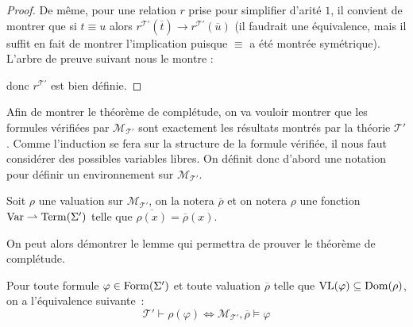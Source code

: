 \begin{proof}
  De même, pour une relation $r$ prise pour simplifier d'arité $1$, il convient
  de montrer que si $t\equiv u$ alors
  $r^{\mathcal T'}(\overline t)\to r^{\mathcal T'}(\overline u)$ (il faudrait une
  équivalence, mais il suffit en fait de montrer l'implication puisque $\equiv$
  a été montrée symétrique). L'arbre de preuve suivant nous le montre :
  \begin{prooftree}
  \end{prooftree}
  donc $r^{\mathcal T'}$ est bien définie.
\end{proof}

Afin de montrer le théorème de complétude, on va vouloir montrer que les
formules vérifiées par $\mathcal M_{\mathcal T'}$ sont exactement les résultats
montrés par la théorie $\mathcal T'$. Comme l'induction se fera sur la structure
de la formule vérifiée, il nous faut considérer des possibles variables libres.
On définit donc d'abord une notation pour définir un environnement sur
$\mathcal M_{\mathcal T'}$.

\begin{definition}
    Soit $\rho$ une valuation sur $\mathcal M_{\mathcal T'}$, on la notera
    $\overline \rho$ et on notera $\rho$ une fonction
    $\Var \partialto \Term(\Sigma')$ telle que
    $\overline{\rho(x)} = \overline\rho(x)$.
\end{definition}

On peut alors démontrer le lemme qui permettra de prouver le théorème de
complétude.

\begin{lemma}
  Pour toute formule $\varphi \in \Formula(\Sigma')$ et toute valuation
  $\overline\rho$ telle que $\VL(\varphi)\subseteq \dom(\rho)$, on a
  l'équivalence suivante~:
  \[\mathcal T' \vdash \rho(\varphi) \iff
  \mathcal M_{\mathcal T'},\overline \rho\models \varphi\]
\end{lemma}

